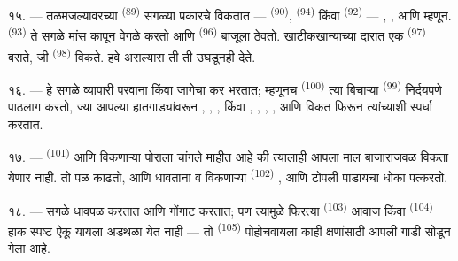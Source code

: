 १५. --- तळमजल्यावरच्या  \textsuperscript{(89)} सगळ्या प्रकारचे
 विकतात —  \textsuperscript{(90)}, 
\textsuperscript{(94)} किंवा  \textsuperscript{(92)} —
, ,  आणि  म्हणून.
 \textsuperscript{(93)} ते सगळे मांस कापून वेगळे करतो आणि
 \textsuperscript{(96)} बाजूला ठेवतो. खाटीकखान्याच्या दारात एक
 \textsuperscript{(97)} बसते, जी  \textsuperscript{(98)}
विकते. हवे असल्यास ती ती उघडूनही देते.

१६. --- हे सगळे व्यापारी परवाना किंवा जागेचा कर भरतात; म्हणूनच 
\textsuperscript{(100)} त्या बिचाऱ्या 
\textsuperscript{(99)} निर्दयपणे पाठलाग करतो, ज्या आपल्या हातगाड्यांवरून ,
, ,  किंवा ,
, , ,  आणि  विकत
फिरून त्यांच्याशी स्पर्धा करतात.

\VUsaut{4.0mm}
\VUsaut{3.0mm}

१७. ---  \textsuperscript{(101)} आणि  विकणाऱ्या पोराला चांगले माहीत
आहे की त्यालाही आपला माल बाजाराजवळ विकता येणार नाही. तो पळ काढतो, आणि धावताना  व
 विकणाऱ्या  \textsuperscript{(102)} ,
 आणि  टोपली पाडायचा धोका पत्करतो.

१८. --- सगळे धावपळ करतात आणि गोंगाट करतात; पण त्यामुळे फिरत्या 
\textsuperscript{(103)} आवाज किंवा  \textsuperscript{(104)} हाक स्पष्ट
ऐकू यायला अडथळा येत नाही — तो  \textsuperscript{(105)} पोहोचवायला काही
क्षणांसाठी आपली गाडी सोडून गेला आहे.

\VUsaut{6.0mm}
\VUfilet{22mm}
